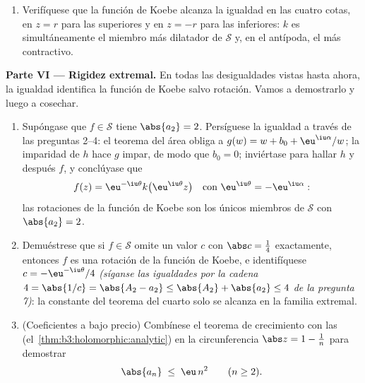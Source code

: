 \begin{problem}
\begin{enumerate}[resume]
{        $[0, f(z)]$ está contenido en $f(\mathbb D)$ por la pregunta 7;
        tírese de él hacia atrás por $f^{-1}$ ---
         por
        el~\cref{cor:b3:residues:openmapping} --- y acótese
        $\abs{f(z)} = \int_\gamma\abs{f'(\zeta)}
        \,\abs{\dd\zeta} \geq \int_0^r\frac{1 - t}{(1 +
        t)^3}\,\dd t$, usando $\abs{\dd\zeta} \geq
        \dd\abs\zeta$)}. \item Verifíquese que la función de Koebe
        alcanza la igualdad en las cuatro cotas, en $z = r$ para las
        superiores y en $z = -r$ para las inferiores: $k$ es
        simultáneamente el miembro más dilatador de $\mathcal S$ y, en
        el antípoda, el más contractivo.
\end{enumerate}

\medskip
\noindent\textbf{Parte VI --- Rigidez extremal.} En todas las
desigualdades vistas hasta ahora, la igualdad identifica la función de
Koebe salvo rotación. Vamos a demostrarlo y luego a cosechar.
\begin{enumerate}[resume]
  \item Supóngase que $f \in \mathcal S$ tiene $\abs{a_2} = 2$.
  Persíguese la igualdad a través de las preguntas 2--4: el teorema del
  área obliga a $g(w) = w + b_0 + \eu^{\iu\alpha}/w$; la imparidad de
  $h$ hace $g$ impar, de modo que $b_0 = 0$; inviértase para hallar $h$
  y después $f$, y conclúyase que
        \[
        f(z) = \eu^{-\iu\theta}k\bigl(\eu^{\iu\theta}z\bigr)
        \quad\text{con } \eu^{\iu\theta} =
        -\eu^{\iu\alpha} :
        \]
        las rotaciones de la función de Koebe son los únicos miembros de
        $\mathcal S$ con $\abs{a_2} = 2$. \item Demuéstrese que si
        $f \in \mathcal S$ omite un valor $c$ con $\abs c = \frac14$
        exactamente, entonces $f$ es una rotación de la función de
        Koebe, e identifíquese $c =
        -\eu^{-\iu\theta}/4$ \emph{(síganse las igualdades por la cadena
        $4 = \abs{1/c} = \abs{A_2 - a_2}
        \leq \abs{A_2} + \abs{a_2} \leq 4$ de la pregunta 7)}: la
        constante del teorema del cuarto solo se alcanza en la familia
        extremal. \item (Coeficientes a bajo precio) Combínese el
        teorema de crecimiento con las
        (el~\cref{thm:b3:holomorphic:analytic}) en la circunferencia
        $\abs z = 1 - \frac1n$ para demostrar
        \[
        \abs{a_n} \;\leq\; \eu\,n^2 \qquad (n \geq 2) .
\]
\end{enumerate}
\end{problem}
